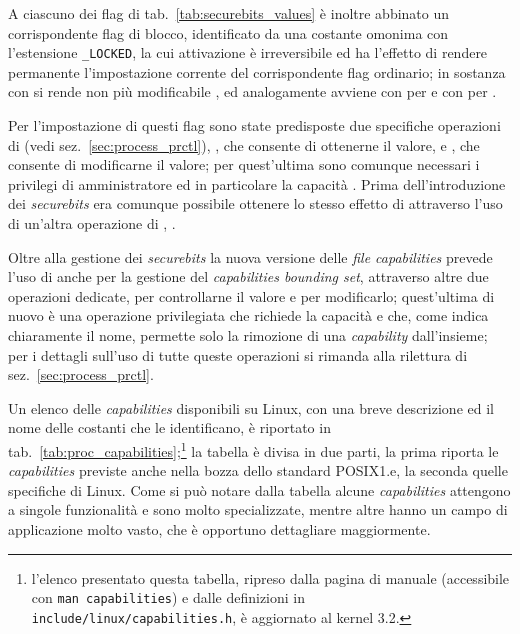 A ciascuno dei flag di tab.~\ref{tab:securebits_values} è inoltre abbinato un
corrispondente flag di blocco, identificato da una costante omonima con
l'estensione \texttt{\_LOCKED}, la cui attivazione è irreversibile ed ha
l'effetto di rendere permanente l'impostazione corrente del corrispondente
flag ordinario; in sostanza con  si rende
non più modificabile , ed analogamente avviene con
 per
 e con  per
.

Per l'impostazione di questi flag sono state predisposte due specifiche
operazioni di  (vedi sez.~\ref{sec:process_prctl}),
, che consente di ottenerne il valore, e
, che consente di modificarne il valore; per
quest'ultima sono comunque necessari i privilegi di amministratore ed in
particolare la capacità . Prima dell'introduzione dei
\textit{securebits} era comunque possibile ottenere lo stesso effetto di
 attraverso l'uso di un'altra operazione di
, .


Oltre alla gestione dei \textit{securebits} la nuova versione delle
\textit{file capabilities} prevede l'uso di  anche per la gestione
del \textit{capabilities bounding set}, attraverso altre due operazioni
dedicate,  per controllarne il valore e
 per modificarlo; quest'ultima di nuovo è una
operazione privilegiata che richiede la capacità  e che,
come indica chiaramente il nome, permette solo la rimozione di una
\textit{capability} dall'insieme; per i dettagli sull'uso di tutte queste
operazioni si rimanda alla rilettura di sez.~\ref{sec:process_prctl}.






Un elenco delle \textit{capabilities} disponibili su Linux, con una breve
descrizione ed il nome delle costanti che le identificano, è riportato in
tab.~\ref{tab:proc_capabilities};\footnote{l'elenco presentato questa tabella,
  ripreso dalla pagina di manuale (accessibile con \texttt{man capabilities})
  e dalle definizioni in \texttt{include/linux/capabilities.h}, è aggiornato
  al kernel 3.2.} la tabella è divisa in due parti, la prima riporta le
\textit{capabilities} previste anche nella bozza dello standard POSIX1.e, la
seconda quelle specifiche di Linux.  Come si può notare dalla tabella alcune
\textit{capabilities} attengono a singole funzionalità e sono molto
specializzate, mentre altre hanno un campo di applicazione molto vasto, che è
opportuno dettagliare maggiormente.

